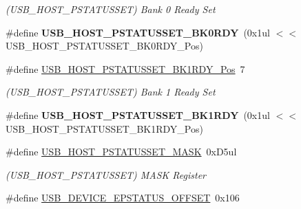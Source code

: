 \begin{DoxyCompactItemize}
\begin{DoxyCompactList}\small\item\em (U\+S\+B\+\_\+\+H\+O\+S\+T\+\_\+\+P\+S\+T\+A\+T\+U\+S\+S\+E\+T) Bank 0 Ready Set \end{DoxyCompactList}\item 
\hypertarget{group___s_a_m_l21___u_s_b_gac0e21132ad2340134ee9b5d693d005a4}{}\#define {\bfseries U\+S\+B\+\_\+\+H\+O\+S\+T\+\_\+\+P\+S\+T\+A\+T\+U\+S\+S\+E\+T\+\_\+\+B\+K0\+R\+D\+Y}~(0x1ul $<$$<$ U\+S\+B\+\_\+\+H\+O\+S\+T\+\_\+\+P\+S\+T\+A\+T\+U\+S\+S\+E\+T\+\_\+\+B\+K0\+R\+D\+Y\+\_\+\+Pos)\label{group___s_a_m_l21___u_s_b_gac0e21132ad2340134ee9b5d693d005a4}

\item 
\hypertarget{group___s_a_m_l21___u_s_b_ga29a097200a386df28b748c586d4a3e69}{}\#define \hyperlink{group___s_a_m_l21___u_s_b_ga29a097200a386df28b748c586d4a3e69}{U\+S\+B\+\_\+\+H\+O\+S\+T\+\_\+\+P\+S\+T\+A\+T\+U\+S\+S\+E\+T\+\_\+\+B\+K1\+R\+D\+Y\+\_\+\+Pos}~7\label{group___s_a_m_l21___u_s_b_ga29a097200a386df28b748c586d4a3e69}

\begin{DoxyCompactList}\small\item\em (U\+S\+B\+\_\+\+H\+O\+S\+T\+\_\+\+P\+S\+T\+A\+T\+U\+S\+S\+E\+T) Bank 1 Ready Set \end{DoxyCompactList}\item 
\hypertarget{group___s_a_m_l21___u_s_b_gad320138f25de6218a2d39856de2d1d3f}{}\#define {\bfseries U\+S\+B\+\_\+\+H\+O\+S\+T\+\_\+\+P\+S\+T\+A\+T\+U\+S\+S\+E\+T\+\_\+\+B\+K1\+R\+D\+Y}~(0x1ul $<$$<$ U\+S\+B\+\_\+\+H\+O\+S\+T\+\_\+\+P\+S\+T\+A\+T\+U\+S\+S\+E\+T\+\_\+\+B\+K1\+R\+D\+Y\+\_\+\+Pos)\label{group___s_a_m_l21___u_s_b_gad320138f25de6218a2d39856de2d1d3f}

\item 
\hypertarget{group___s_a_m_l21___u_s_b_ga5d2001f603ae5a3d6e1418701d571ff9}{}\#define \hyperlink{group___s_a_m_l21___u_s_b_ga5d2001f603ae5a3d6e1418701d571ff9}{U\+S\+B\+\_\+\+H\+O\+S\+T\+\_\+\+P\+S\+T\+A\+T\+U\+S\+S\+E\+T\+\_\+\+M\+A\+S\+K}~0x\+D5ul\label{group___s_a_m_l21___u_s_b_ga5d2001f603ae5a3d6e1418701d571ff9}

\begin{DoxyCompactList}\small\item\em (U\+S\+B\+\_\+\+H\+O\+S\+T\+\_\+\+P\+S\+T\+A\+T\+U\+S\+S\+E\+T) M\+A\+S\+K Register \end{DoxyCompactList}\item 
\hypertarget{group___s_a_m_l21___u_s_b_gaae7c6b2350f9aa133a56c27d6a24a5a0}{}\#define \hyperlink{group___s_a_m_l21___u_s_b_gaae7c6b2350f9aa133a56c27d6a24a5a0}{U\+S\+B\+\_\+\+D\+E\+V\+I\+C\+E\+\_\+\+E\+P\+S\+T\+A\+T\+U\+S\+\_\+\+O\+F\+F\+S\+E\+T}~0x106\label{group___s_a_m_l21___u_s_b_gaae7c6b2350f9aa133a56c27d6a24a5a0}


\end{DoxyCompactItemize}
